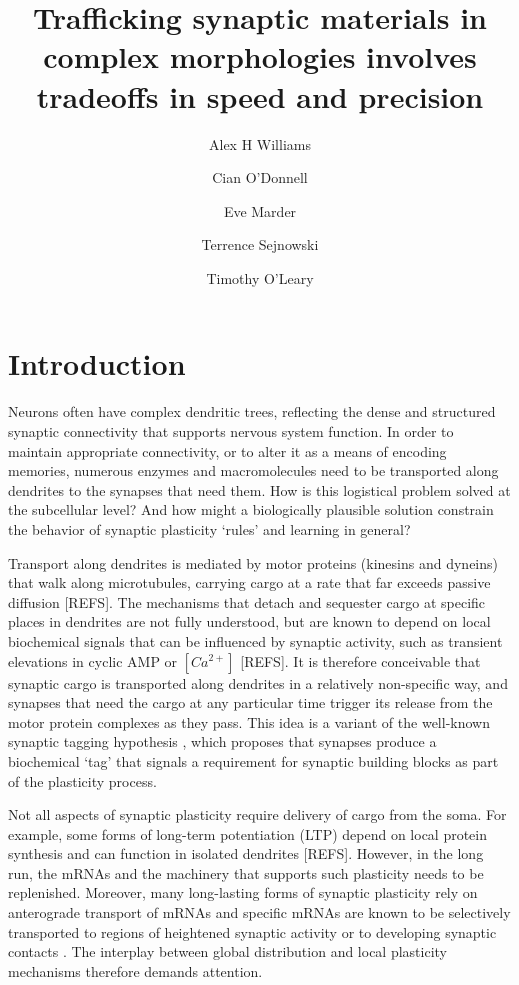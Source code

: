 \documentclass[fleqn,10pt]{wlpeerj}
\title{Trafficking synaptic materials in complex morphologies involves tradeoffs in speed and precision}
\author[1,2]{Alex H Williams}
\author[2]{Cian O'Donnell}
\author[3]{Eve Marder}
\author[2]{Terrence Sejnowski}
\author[3]{Timothy O'Leary}
\affil[1]{Stanford University}
\affil[2]{Salk Institute}
\affil[3]{Brandeis University}
\begin{document}
\flushbottom
\maketitle
\thispagestyle{empty}

\section*{Introduction}

Neurons often have complex dendritic trees, reflecting the dense and structured synaptic connectivity that supports nervous system function. In order to maintain appropriate connectivity, or to alter it as a means of encoding memories, numerous enzymes and macromolecules need to be transported along dendrites to the synapses that need them. How is this logistical problem solved at the subcellular level? And how might a biologically plausible solution constrain the behavior of synaptic plasticity `rules' and learning in general?

Transport along dendrites is mediated by motor proteins (kinesins and dyneins) that walk along microtubules, carrying cargo at a rate that far exceeds passive diffusion [REFS]. The mechanisms that detach and sequester cargo at specific places in dendrites are not fully understood, but are known to depend on local biochemical signals that can be influenced by synaptic activity, such as transient elevations in cyclic AMP or $[Ca^{2+}]$ [REFS]. It is therefore conceivable that synaptic cargo is transported along dendrites in a relatively non-specific way, and synapses that need the cargo at any particular time trigger its release from the motor protein complexes as they pass. This idea is a variant of the well-known synaptic tagging hypothesis \citep{Frey_1997}, which proposes that synapses produce a biochemical `tag' that signals a requirement for synaptic building blocks as part of the plasticity process.

Not all aspects of synaptic plasticity require delivery of cargo from the soma. For example, some forms of long-term potentiation (LTP) depend on local protein synthesis and can function in isolated dendrites [REFS]. However, in the long run, the mRNAs and the machinery that supports such plasticity needs to be replenished. Moreover, many long-lasting forms of synaptic plasticity rely on anterograde transport of mRNAs \citep{Kandel_2001,Puthanveettil_2008} and specific mRNAs are known to be selectively transported to regions of heightened synaptic activity \citep{Steward_1998,Steward_2001,Moga_2004} or to developing synaptic contacts \citep{Lyles_2006}. The interplay between global distribution and local plasticity mechanisms therefore demands attention.
\end{document}
